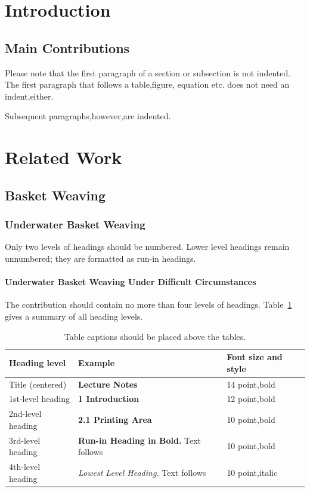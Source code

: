 \documentclass[runningheads]{llncs}
\begin{document}
\begin{abstract}
The abstract should briefly summarize the contents of the paper in
150--250 words.

\end{abstract}

\section{Introduction}
\subsection{Main Contributions}
Please note that the first paragraph of a section or subsection is
not indented. The first paragraph that follows a table,figure,
equation etc. does not need an indent,either.

Subsequent paragraphs,however,are indented.

\section{Related Work}
\subsection{Basket Weaving}
\subsubsection{Underwater Basket Weaving} Only two levels of
headings should be numbered. Lower level headings remain unnumbered;
they are formatted as run-in headings.

\paragraph{Underwater Basket Weaving Under Difficult Circumstances}
The contribution should contain no more than four levels of
headings. Table~\ref{tab1} gives a summary of all heading levels.

\begin{table}[t]
\caption{Table captions should be placed above the
tables.}\label{tab1}
\begin{tabular}{lll}
\toprule
Heading level &  Example & Font size and style\\
\midrule
Title (centered) &  {\Large\bfseries Lecture Notes} & 14 point,bold\\
1st-level heading &  {\large\bfseries 1 Introduction} & 12 point,bold\\
2nd-level heading & {\bfseries 2.1 Printing Area} & 10 point,bold\\
3rd-level heading & {\bfseries Run-in Heading in Bold.} Text follows & 10 point,bold\\
4th-level heading & {\itshape Lowest Level Heading.} Text follows & 10 point,italic\\
\bottomrule
\end{tabular}
\end{table}
\end{document}
